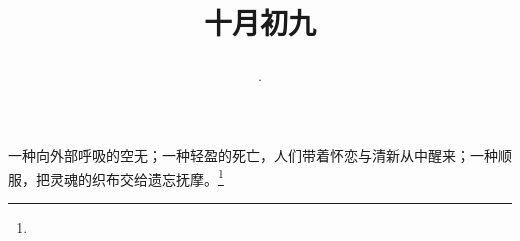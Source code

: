 \title{\date[d=9,m=11,y=2024][year:cn-y,年,month:cn,day:cn,日,·,weekday]·十月初九 }
一种向外部呼吸的空无；一种轻盈的死亡，人们带着怀恋与清新从中醒来；一种顺服，把灵魂的织布交给遗忘抚摩。\footnote{ }


